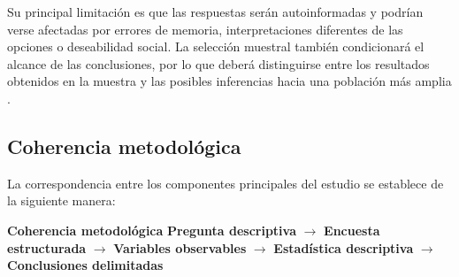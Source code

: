 Su principal limitación es que las respuestas serán autoinformadas y podrían verse afectadas por errores de memoria, interpretaciones diferentes de las opciones o deseabilidad social. La selección muestral también condicionará el alcance de las conclusiones, por lo que deberá distinguirse entre los resultados obtenidos en la muestra y las posibles inferencias hacia una población más amplia \parencite{argibay2009muestra}.

\subsection{Coherencia metodológica}

La correspondencia entre los componentes principales del estudio se establece de la siguiente manera:


\begin{callout}
    \textbf{Coherencia metodológica}
    \smallskip
    \centering
    \textbf{Pregunta descriptiva}
    \(\rightarrow\)
    \textbf{Encuesta estructurada}
    \(\rightarrow\)
    \textbf{Variables observables}
    \(\rightarrow\)
    \textbf{Estadística descriptiva}
    \(\rightarrow\)
    \textbf{Conclusiones delimitadas}
\end{callout}
